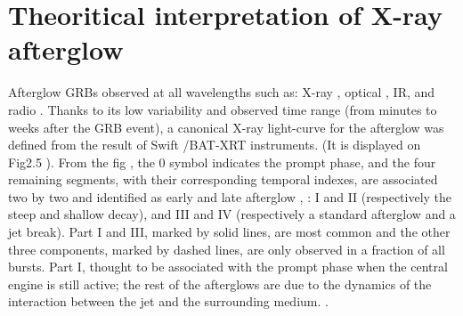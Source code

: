 \section{Theoritical interpretation of X-ray afterglow}
Afterglow GRBs  observed at all wavelengths such as: X-ray \citep{26}, optical \citep{27}, IR, and radio \citep{28}. Thanks to its low variability and observed time range (from minutes to weeks after the GRB event), a canonical X-ray light-curve for the afterglow was defined from the result of Swift /BAT-XRT instruments. (It is displayed on Fig2.5 ). From the fig , the 0 symbol indicates the prompt phase, and the four remaining segments, with their corresponding temporal indexes, are associated two by two and identified as early and late afterglow \citep{29},\citep{30}\citep{31} : I and II (respectively the steep and shallow decay), and III and IV (respectively a standard afterglow and a jet break). Part I and III, marked by solid lines, are most common and the other three components, marked by dashed lines, are only observed in a fraction of all bursts. Part I, thought to be associated with the prompt phase  when the central engine is still active; the rest of the afterglows are due to the dynamics of the interaction between the jet and the surrounding medium.\citep{6}\cite {15}\citep{18} \citep{32}.\\\\
